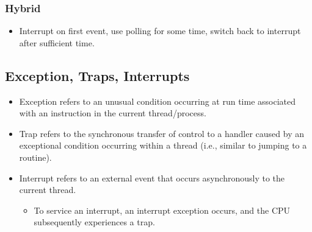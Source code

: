\documentclass[10pt]{article}
\begin{document}
\subsubsection*{Hybrid}
\begin{itemize}
    \item Interrupt on first event, use polling for some time, switch back to interrupt after sufficient time.
\end{itemize}
\subsection*{Exception, Traps, Interrupts}
\begin{itemize}
    \item Exception refers to an unusual condition occurring at run time associated with an instruction in the current thread/process.
    \item Trap refers to the synchronous transfer of control to a handler caused by an exceptional condition occurring within a thread (i.e., similar to jumping to a routine).
    \item Interrupt refers to an external event that occurs asynchronously to the current thread.
    \begin{itemize}
        \item To service an interrupt, an interrupt exception occurs, and the CPU subsequently experiences a trap.
    \end{itemize}   
\end{itemize}
\end{document}
